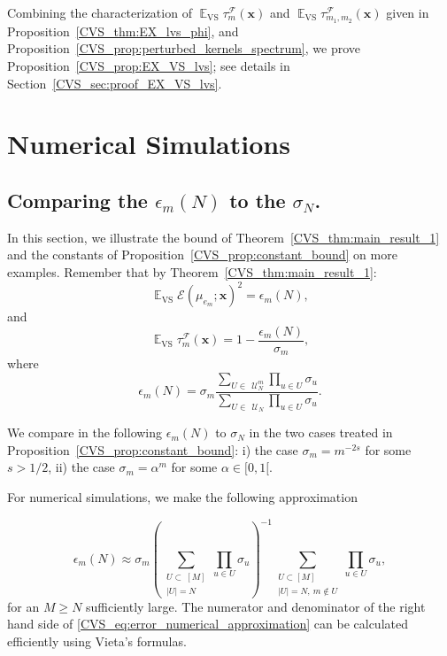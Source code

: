 \documentclass[twoside,11pt]{book}
\numberwithin{theorem}{chapter}
\numberwithin{definition}{chapter}
\numberwithin{proposition}{chapter}
\numberwithin{corollary}{chapter}
\numberwithin{example}{chapter}
\numberwithin{lemma}{chapter}
\numberwithin{assumption}{chapter}
\numberwithin{equation}{chapter}
\numberwithin{figure}{chapter}
\DeclareMathOperator{\VS}{\mathrm{VS}}
\DeclareMathOperator{\EX}{\mathbb{E}}
\DeclareMathOperator{\F}{\mathcal{F}}
\def\UN{\:\mathcal{U}_N}
\def\UNm{\:\mathcal{U}_N^m}
\begin{document}
Combining the characterization of $\EX_{\VS} \tau_{m}^{\F}(\bm{x})$ and $\EX_{\VS} \tau_{m_{1},m_{2}}^{\F}(\bm{x})$ given in Proposition~\ref{CVS_thm:EX_lvs_phi}, and Proposition~\ref{CVS_prop:perturbed_kernels_spectrum}, we prove Proposition~\ref{CVS_prop:EX_VS_lvs}; see details in Section~\ref{CVS_sec:proof_EX_VS_lvs}.
\section{Numerical Simulations}
\subsection{Comparing the $\epsilon_{m}(N)$ to the $\sigma_{N}$.}
In this section, we illustrate the bound of Theorem~\ref{CVS_thm:main_result_1} and the constants of Proposition~\ref{CVS_prop:constant_bound} on more examples.
Remember that by Theorem~\ref{CVS_thm:main_result_1}:
\begin{equation}
\EX_{\VS} \mathcal{E}(\mu_{e_{m}};\bm{x})^{2} = \epsilon_{m}(N),
\end{equation}
and
\begin{equation}
\EX_{\VS} \tau_{m}^{\F}(\bm{x}) = 1- \frac{\epsilon_{m}(N)}{\sigma_{m}},
\end{equation}
where
\begin{equation}
\epsilon_{m}(N) =\sigma_{m} \frac{  \sum\limits_{U \in \: \UNm} \prod\limits_{u \in U} \sigma_{u}}{\sum\limits_{ U \in \: \UN} \prod\limits_{u \in U} \sigma_{u}}.
\end{equation}

We compare in the following $\epsilon_{m}(N)$ to $\sigma_{N}$ in the two cases treated in Proposition~\ref{CVS_prop:constant_bound}: i) the case  $\sigma_{m} = m^{-2s}$ for some $s>1/2$, ii) the case $\sigma_{m} = \alpha^{m}$ for some $\alpha \in [0,1[$.

For numerical simulations, we make the following approximation

\begin{equation}\label{CVS_eq:error_numerical_approximation}
\epsilon_{m}(N) \approx \sigma_{m} \left(\sum\limits_{\substack{U \subset \: [M]\\ |U|=N}} \prod\limits_{u \in U} \sigma_{u} \right)^{-1}  \sum\limits_{\substack{U \subset [M]\\ |U|=N, \: m \notin U}} \prod\limits_{u \in U} \sigma_{u},
\end{equation}
for an $M \geq N$ sufficiently large. The numerator and denominator of the right hand side of \eqref{CVS_eq:error_numerical_approximation} can be calculated efficiently using Vieta's formulas.
\end{document}

